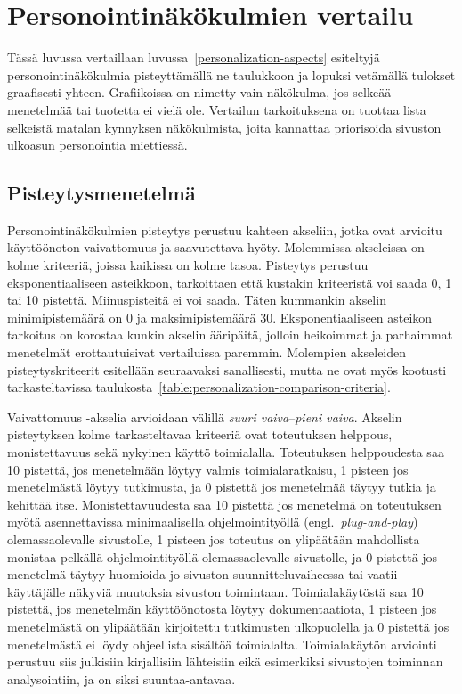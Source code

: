 \documentclass[finnish, 12pt, a4paper, elec, utf8, a-1b, online]{aaltothesis}
\begin{document}
\clearpage
\section{Personointinäkökulmien vertailu}\label{personalization-comparison}

Tässä luvussa vertaillaan luvussa~\ref{personalization-aspects} esiteltyjä
personointinäkökulmia pisteyttämällä ne taulukkoon ja lopuksi vetämällä tulokset
graafisesti yhteen. Grafiikoissa on nimetty vain näkökulma, jos selkeää
menetelmää tai tuotetta ei vielä ole. Vertailun tarkoituksena on tuottaa lista
selkeistä matalan kynnyksen näkökulmista, joita kannattaa priorisoida sivuston
ulkoasun personointia miettiessä.

\subsection{Pisteytysmenetelmä}

Personointinäkökulmien pisteytys perustuu kahteen akseliin, jotka ovat arvioitu
käyttöönoton vaivattomuus ja saavutettava hyöty. Molemmissa akseleissa on kolme
kriteeriä, joissa kaikissa on kolme tasoa. Pisteytys perustuu eksponentiaaliseen
asteikkoon, tarkoittaen että kustakin kriteeristä voi saada 0, 1 tai 10
pistettä. Miinuspisteitä ei voi saada. Täten kummankin akselin minimipistemäärä
on 0 ja maksimipistemäärä 30. Eksponentiaaliseen asteikon tarkoitus on korostaa
kunkin akselin ääripäitä, jolloin heikoimmat ja parhaimmat menetelmät
erottautuisivat vertailuissa paremmin. Molempien akseleiden pisteytyskriteerit
esitellään seuraavaksi sanallisesti, mutta ne ovat myös kootusti
tarkasteltavissa taulukosta~\ref{table:personalization-comparison-criteria}.

Vaivattomuus -akselia arvioidaan välillä \textit{suuri vaiva}--\textit{pieni
vaiva}. Akselin pisteytyksen kolme tarkasteltavaa kriteeriä ovat toteutuksen
helppous, monistettavuus sekä nykyinen käyttö toimialalla. Toteutuksen
helppoudesta saa 10 pistettä, jos menetelmään löytyy valmis toimialaratkaisu, 1
pisteen jos menetelmästä löytyy tutkimusta, ja 0 pistettä jos menetelmää täytyy
tutkia ja kehittää itse. Monistettavuudesta saa 10 pistettä jos menetelmä on
toteutuksen myötä asennettavissa minimaalisella ohjelmointityöllä
(engl.~\textit{plug-and-play}) olemassaolevalle sivustolle, 1 pisteen jos
toteutus on ylipäätään mahdollista monistaa pelkällä ohjelmointityöllä
olemassaolevalle sivustolle, ja 0 pistettä jos menetelmä täytyy huomioida jo
sivuston suunnitteluvaiheessa tai vaatii käyttäjälle näkyviä muutoksia sivuston
toimintaan. Toimialakäytöstä saa 10 pistettä, jos menetelmän käyttöönotosta
löytyy dokumentaatiota, 1 pisteen jos menetelmästä on ylipäätään kirjoitettu
tutkimusten ulkopuolella ja 0 pistettä jos menetelmästä ei löydy ohjeellista
sisältöä toimialalta. Toimialakäytön arviointi perustuu siis julkisiin
kirjallisiin lähteisiin eikä esimerkiksi sivustojen toiminnan analysointiin, ja
on siksi suuntaa-antavaa.
\end{document}
